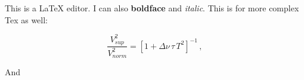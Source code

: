 This is a LaTeX editor. I can also \textbf{boldface} and \textit{italic}. This is for more complex Tex as well:

\begin{equation}
\frac{V_{ sup}^2}{V_{ norm}^2} = [1 + \Delta \nu \, \tau \, T^2 ]^{-1} \, ,
\end{equation}

And 